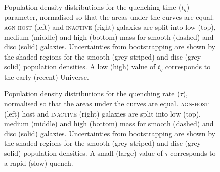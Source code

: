 \begin{figure}
\caption[Quenching time population density distributions for the \textsc{agn-host} and \textsc{inactive} samples] {Population density distributions for the quenching time ($t_q$) parameter, normalised so that the areas under the curves are equal. \textsc{agn-host} (left) and \textsc{inactive} (right) galaxies are split into low (top), medium (middle) and high (bottom) mass for smooth (dashed) and disc (solid) galaxies. Uncertainties from bootstrapping are shown by the shaded regions for the smooth (grey striped) and disc (grey solid) population densities. A low (high) value of $t_q$ corresponds to the early (recent) Universe.}
\label{time}
\end{figure}


\begin{figure}
\caption[Quenching rate population density distributions for the \textsc{agn-host} and \textsc{inactive} samples]{Population density distributions for the quenching rate ($\tau$), normalised so that the areas under the curves are equal. \textsc{agn-host} (left) host and \textsc{inactive} (right) galaxies are split into low (top), medium (middle) and high (bottom) mass for smooth (dashed) and disc (solid) galaxies. Uncertainties from bootstrapping are shown by the shaded regions for the smooth (grey striped) and disc (grey solid) population densities. A small (large) value of $\tau$ corresponds to a rapid (slow) quench.}
\label{rate}
\end{figure}

